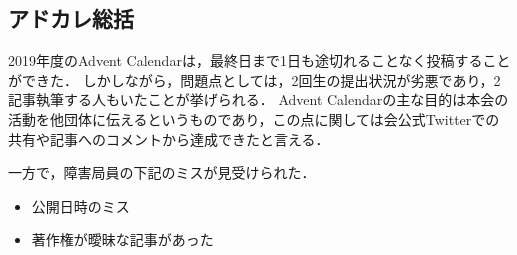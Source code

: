 \subsection*{アドカレ総括}


2019年度のAdvent Calendarは，最終日まで1日も途切れることなく投稿することができた．
しかしながら，問題点としては，2回生の提出状況が劣悪であり，2記事執筆する人もいたことが挙げられる．
Advent Calendarの主な目的は本会の活動を他団体に伝えるというものであり，この点に関しては会公式Twitterでの共有や記事へのコメントから達成できたと言える．

一方で，障害局員の下記のミスが見受けられた．
\begin{itemize}
\item 公開日時のミス
\item 著作権が曖昧な記事があった
\end{itemize}

